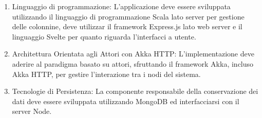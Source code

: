 \begin{enumerate}[label=\arabic*.]
    \item Linguaggio di programmazione: L'applicazione deve essere sviluppata utilizzando il
          linguaggio di programmazione Scala lato server per gestione delle colonnine, deve utilizzar
          il framework Express.js\cite{express} lato web server e il linguaggio Svelte per quanto riguarda l'interfacci
          a utente.
    \item Architettura Orientata agli Attori con Akka HTTP\cite{akkahttp}: L'implementazione deve aderire al paradigma
          basato su attori, sfruttando il framework Akka, incluso Akka HTTP, per gestire l'interazione tra i
          nodi del sistema.
    \item Tecnologie di Persistenza: La componente responsabile della conservazione dei dati deve essere
          sviluppata utilizzando MongoDB ed interfacciarsi con il server Node.
\end{enumerate}







\newpage
